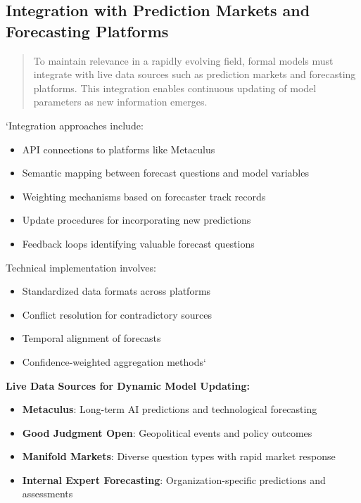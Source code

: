 \documentclass[
  11pt,
  letterpaper,
]{book}
\providecommand{\tightlist}{%
  \setlength{\itemsep}{0pt}\setlength{\parskip}{0pt}}
\begin{document}
\subsection{Integration with Prediction Markets and Forecasting
Platforms}\label{sec-prediction-markets}

\begin{quote}
To maintain relevance in a rapidly evolving field, formal models must
integrate with live data sources such as prediction markets and
forecasting platforms. This integration enables continuous updating of
model parameters as new information emerges.
\end{quote}

`Integration approaches include:

\begin{itemize}
\tightlist
\item
  API connections to platforms like Metaculus
\item
  Semantic mapping between forecast questions and model variables
\item
  Weighting mechanisms based on forecaster track records
\item
  Update procedures for incorporating new predictions
\item
  Feedback loops identifying valuable forecast questions
\end{itemize}

Technical implementation involves:

\begin{itemize}
\tightlist
\item
  Standardized data formats across platforms
\item
  Conflict resolution for contradictory sources
\item
  Temporal alignment of forecasts
\item
  Confidence-weighted aggregation methods`
\end{itemize}

\textbf{Live Data Sources for Dynamic Model Updating:}

\begin{itemize}
\tightlist
\item
  \textbf{Metaculus}: Long-term AI predictions and technological
  forecasting
\item
  \textbf{Good Judgment Open}: Geopolitical events and policy outcomes
\item
  \textbf{Manifold Markets}: Diverse question types with rapid market
  response
\item
  \textbf{Internal Expert Forecasting}: Organization-specific
  predictions and assessments
\end{itemize}
\end{document}
